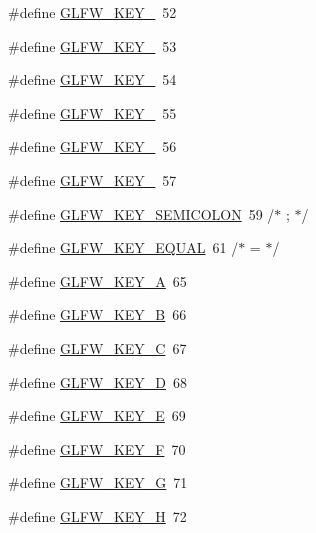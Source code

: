 \begin{DoxyCompactItemize}
\#define \mbox{\hyperlink{group__keys_ga9e14b6975a9cc8f66cdd5cb3d3861356}{G\+L\+F\+W\+\_\+\+K\+E\+Y\+\_}}~52
\item 
\#define \mbox{\hyperlink{group__keys_ga4d74ddaa5d4c609993b4d4a15736c924}{G\+L\+F\+W\+\_\+\+K\+E\+Y\+\_}}~53
\item 
\#define \mbox{\hyperlink{group__keys_ga9ea4ab80c313a227b14d0a7c6f810b5d}{G\+L\+F\+W\+\_\+\+K\+E\+Y\+\_}}~54
\item 
\#define \mbox{\hyperlink{group__keys_gab79b1cfae7bd630cfc4604c1f263c666}{G\+L\+F\+W\+\_\+\+K\+E\+Y\+\_}}~55
\item 
\#define \mbox{\hyperlink{group__keys_gadeaa109a0f9f5afc94fe4a108e686f6f}{G\+L\+F\+W\+\_\+\+K\+E\+Y\+\_}}~56
\item 
\#define \mbox{\hyperlink{group__keys_ga2924cb5349ebbf97c8987f3521c44f39}{G\+L\+F\+W\+\_\+\+K\+E\+Y\+\_}}~57
\item 
\#define \mbox{\hyperlink{group__keys_ga84233de9ee5bb3e8788a5aa07d80af7d}{G\+L\+F\+W\+\_\+\+K\+E\+Y\+\_\+\+S\+E\+M\+I\+C\+O\+L\+ON}}~59  /$\ast$ ; $\ast$/
\item 
\#define \mbox{\hyperlink{group__keys_gae1a2de47240d6664423c204bdd91bd17}{G\+L\+F\+W\+\_\+\+K\+E\+Y\+\_\+\+E\+Q\+U\+AL}}~61  /$\ast$ = $\ast$/
\item 
\#define \mbox{\hyperlink{group__keys_ga03e842608e1ea323370889d33b8f70ff}{G\+L\+F\+W\+\_\+\+K\+E\+Y\+\_\+A}}~65
\item 
\#define \mbox{\hyperlink{group__keys_ga8e3fb647ff3aca9e8dbf14fe66332941}{G\+L\+F\+W\+\_\+\+K\+E\+Y\+\_\+B}}~66
\item 
\#define \mbox{\hyperlink{group__keys_ga00ccf3475d9ee2e679480d540d554669}{G\+L\+F\+W\+\_\+\+K\+E\+Y\+\_\+C}}~67
\item 
\#define \mbox{\hyperlink{group__keys_ga011f7cdc9a654da984a2506479606933}{G\+L\+F\+W\+\_\+\+K\+E\+Y\+\_\+D}}~68
\item 
\#define \mbox{\hyperlink{group__keys_gabf48fcc3afbe69349df432b470c96ef2}{G\+L\+F\+W\+\_\+\+K\+E\+Y\+\_\+E}}~69
\item 
\#define \mbox{\hyperlink{group__keys_ga5df402e02aca08444240058fd9b42a55}{G\+L\+F\+W\+\_\+\+K\+E\+Y\+\_\+F}}~70
\item 
\#define \mbox{\hyperlink{group__keys_gae74ecddf7cc96104ab23989b1cdab536}{G\+L\+F\+W\+\_\+\+K\+E\+Y\+\_\+G}}~71
\item 
\#define \mbox{\hyperlink{group__keys_gad4cc98fc8f35f015d9e2fb94bf136076}{G\+L\+F\+W\+\_\+\+K\+E\+Y\+\_\+H}}~72
\item 

\end{DoxyCompactItemize}
